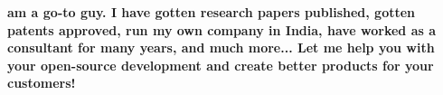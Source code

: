 \textbf{am a go-to guy. I have gotten research papers published, gotten patents approved, run my own company in India, have worked as a consultant for many years, and much more... Let me help you with your open-source development and create better products for your customers!}

